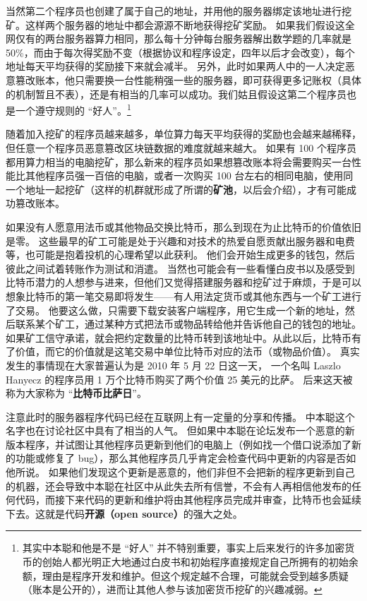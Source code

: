 当然第二个程序员也创建了属于自己的地址，并用他的服务器绑定该地址进行挖矿。这样两个服务器的地址中都会源源不断地获得挖矿奖励。 如果我们假设这全网仅有的两台服务器算力相同，那么每十分钟每台服务器解出数学题的几率就是 50\%，而由于每次得奖励不变（根据协议和程序设定，四年以后才会改变），每个地址每天平均获得的奖励接下来就会减半。 另外，此时如果两人中的一人决定恶意篡改账本，他只需要换一台性能稍强一些的服务器，即可获得更多记账权（具体的机制暂且不表），还是有相当的几率可以成功。我们姑且假设这第二个程序员也是一个遵守规则的 “好人”。\footnote{其实中本聪和他是不是 “好人” 并不特别重要，事实上后来发行的许多加密货币的创始人都光明正大地通过白皮书和初始程序直接规定自己所拥有的初始余额，理由是程序开发和维护。但这个规定越不合理，可能就会受到越多质疑（账本是公开的），进而让其他人参与该加密货币挖矿的兴趣减弱。}

随着加入挖矿的程序员越来越多，单位算力每天平均获得的奖励也会越来越稀释，但任意一个程序员恶意篡改区块链数据的难度就越来越大。 如果有 100 个程序员都用算力相当的电脑挖矿，那么新来的程序员如果想篡改账本将会需要购买一台性能比其他程序员强一百倍的电脑，或者一次购买 100 台左右的相同电脑，使用同一个地址一起挖矿（这样的机群就形成了所谓的\textbf{矿池}，以后会介绍），才有可能成功篡改账本。

如果没有人愿意用法币或其他物品交换比特币，那么到现在为止比特币的价值依旧是零。 这些最早的矿工可能是处于兴趣和对技术的热爱自愿贡献出服务器和电费等，也可能是抱着投机的心理希望以此获利。 他们会开始生成更多的钱包，然后彼此之间试着转账作为测试和消遣。 当然也可能会有一些看懂白皮书以及感受到比特币潜力的人想参与进来，但他们又觉得搭建服务器和挖矿过于麻烦，于是可以想象比特币的第一笔交易即将发生——有人用法定货币或其他东西与一个矿工进行了交易。 他要这么做，只需要下载安装客户端程序，用它生成一个新的地址，然后联系某个矿工，通过某种方式把法币或物品转给他并告诉他自己的钱包的地址。 如果矿工信守承诺，就会把约定数量的比特币转到该地址中。从此以后，比特币有了价值，而它的价值就是这笔交易中单位比特币对应的法币（或物品价值）。 真实发生的事情现在大家普遍认为是 2010 年 5 月 22 日这一天， 一个名叫 Laszlo Hanyecz 的程序员用 1 万个比特币购买了两个价值 25 美元的比萨。 后来这天被称为大家称为 “\textbf{比特币比萨日}”。

注意此时的服务器程序代码已经在互联网上有一定量的分享和传播。 中本聪这个名字也在讨论社区中具有了相当的人气。 但如果中本聪在论坛发布一个恶意的新版本程序，并试图让其他程序员更新到他们的电脑上（例如找一个借口说添加了新的功能或修复了 bug），那么其他程序员几乎肯定会检查代码中更新的内容是否如他所说。 如果他们发现这个更新是恶意的，他们非但不会把新的程序更新到自己的机器，还会导致中本聪在社区中从此失去所有信誉，不会有人再相信他发布的任何代码，而接下来代码的更新和维护将由其他程序员完成并审查，比特币也会延续下去。这就是代码\textbf{开源（open source）}的强大之处。

